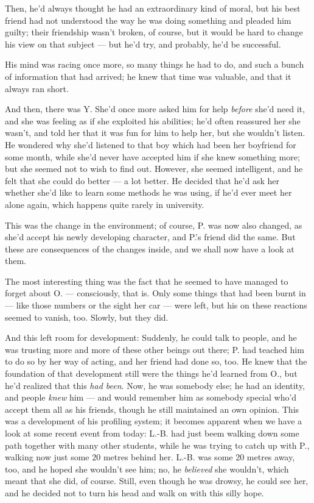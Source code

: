 Then, he'd always thought he had an extraordinary kind of moral, but his best friend had not understood the way he was doing something and pleaded him guilty; their friendship wasn't broken, of course, but it would be hard to change his view on that subject --- but he'd try, and probably, he'd be successful.

His mind was racing once more, so many things he had to do, and such a bunch of information that had arrived; he knew that time was valuable, and that it always ran short.

And then, there was Y. She'd once more asked him for help \emph{before} she'd need it, and she was feeling as if she exploited his abilities; he'd often reassured her she wasn't, and told her that it was fun for him to help her, but she wouldn't listen. He wondered why she'd listened to that boy which had been her boyfriend for some month, while she'd never have accepted him if she knew something more; but she seemed not to wish to find out. However, she seemed intelligent, and he felt that she could do better --- a lot better. He decided that he'd ask her whether she'd like to learn some methods he was using, if he'd ever meet her alone again, which happens quite rarely in university.

This was the change in the environment; of course, P. was now also changed, as she'd accept his newly developing character, and P.'s friend did the same. But these are consequences of the changes inside, and we shall now have a look at them.

The most interesting thing was the fact that he seemed to have managed to forget about O. --- consciously, that is. Only some things that had been burnt in --- like those numbers or the sight her car --- were left, but his on these reactions seemed to vanish, too. Slowly, but they did.

And this left room for development: Suddenly, he could talk to people, and he was trusting more and more of these other beings out there; P. had teached him to do so by her way of acting, and her friend had done so, too. He knew that the foundation of that development still were the things he'd learned from O., but he'd realized that this \emph{had been}. Now, he was somebody else; he had an identity, and people \emph{knew} him --- and would remember him as somebody special who'd accept them all as his friends, though he still maintained an own opinion. This was a development of his profiling system; it becomes apparent when we have a look at some recent event from today: L.-B. had just beem walking down some path together with many other students, while he was trying to catch up with P., walking now just some 20 metres behind her. L.-B. was some 20 metres away, too, and he hoped she wouldn't see him; no, he \emph{believed} she wouldn't, which meant that she did, of course. Still, even though he was drowsy, he could see her, and he decided not to turn his head and walk on with this silly hope.

